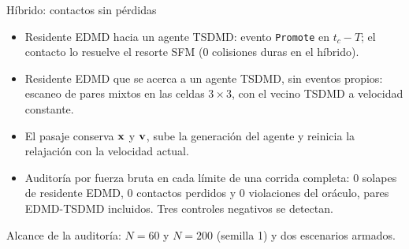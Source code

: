 \begin{frame}{Híbrido: contactos sin pérdidas}
  \small
  \begin{itemize}
    \item Residente EDMD hacia un agente TSDMD: evento \texttt{Promote} en $t_c - T$; el
      contacto lo resuelve el resorte SFM (0 colisiones duras en el híbrido).
    \item Residente EDMD que se acerca a un agente TSDMD, sin eventos propios: escaneo de
      pares mixtos en las celdas $3\times3$, con el vecino TSDMD a velocidad constante.
    \item El pasaje conserva $\mathbf{x}$ y $\mathbf{v}$, sube la generación del agente y reinicia
      la relajación con la velocidad actual.
    \item Auditoría por fuerza bruta en cada límite de una corrida completa: 0 solapes de
      residente EDMD, 0 contactos perdidos y 0 violaciones del oráculo, pares EDMD-TSDMD
      incluidos. Tres controles negativos se detectan.
  \end{itemize}
  \vfill
  {\footnotesize Alcance de la auditoría: $N=60$ y $N=200$ (semilla 1) y dos escenarios
  armados.}
\end{frame}
